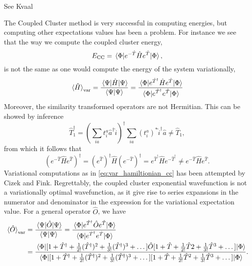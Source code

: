 See Kvaal\cite{kvaal2013variational}

The Coupled Cluster method is very successful in computing energies, but computing other 
expectations values has been a problem. For instance we see that the way we compute the
coupled cluster energy,
\begin{equation}
    E_{\text{CC}} = \mel{\Phi}{e^{-\hat{T}}\hat{H}e^{\hat{T}}}{\Phi},
\end{equation}
is not the same as one would compute the energy of the system variationally,
\begin{equation}
    \label{eq:var_hamiltionian_cc}
    \ev*{\hat{H}}_{\text{var}} = \frac{\mel{\Psi}{\hat{H}}{\Psi}}{\braket{\Psi}}
        = \frac{ \mel{\Phi}{e^{\hat{T}^\dagger} \hat{H} e^{\hat{T}}}{\Phi} }
            {\mel{\Phi}{e^{\hat{T}^\dagger} e^{\hat{T}}}{\Phi}}
\end{equation}
Moreover, the similarity transformed operators are not Hermitian. This can be 
showed by inference
\begin{equation}
    \hat{T}^\dagger_1 = \left(\sum_{ia}t^a_i\hat{a}^\dagger \hat{i} \right)^\dagger 
        \sum_{ia} (t^a_i)^* \hat{i}^\dagger\hat{a} \neq \hat{T}_1,
\end{equation}
from which it follows that 
\begin{equation}
    \left(e^{-\hat{T}}\hat{H}e^{\hat{T}} \right)^\dagger
        = (e^{\hat{T}})^\dagger\hat{H}(e^{-\hat{T}})^\dagger
        = e^{\hat{T}^\dagger}\hat{H}e^{-\hat{T}^\dagger} 
        \neq e^{-\hat{T}}\hat{H}e^{\hat{T}}.
\end{equation}
Variational computations as in \autoref{eq:var_hamiltionian_cc} has been attempted 
by Cizek\cite{vcivzek1966correlation} and Fink\cite{fink1974new}.
Regrettably, the coupled cluster exponential 
wavefunction is not a variationally optimal wavefunction, as it give rise to
series expansions in the 
numerator and denominator in the expression for the variational expectation value. 
For a general operator $\hat{O}$, we have
\begin{equation}
    \begin{aligned}
        \label{eq:variational_exp_val_cc}
        \ev*{\hat{O}}_{\text{var}} &=\frac{ \mel{\Psi}{\hat{O}}{\Psi} }{\braket{\Psi}} 
            = \frac{ \mel{\Phi}{e^{\hat{T}^\dagger} \hat{O} e^{\hat{T}}}{\Phi} }
                {\mel{\Phi}{e^{\hat{T}^\dagger} e^{\hat{T}}}{\Phi}} \\
            &= \frac{
                \mel{\Phi}{
                [1 + \hat{T}^\dagger + \frac{1}{2!}(\hat{T}^\dagger)^2 + \frac{1}{3!}(\hat{T}^\dagger)^3 + \dots]
                \hat{O} 
                [1 + \hat{T}+ \frac{1}{2!}\hat{T}2 + \frac{1}{3!}\hat{T}^3 + \dots]
                }{\Phi}
                }{
                \mel
                {\Phi}
                {
                [1 + \hat{T}^\dagger + \frac{1}{2!}(\hat{T}^\dagger)^2 + \frac{1}{3!}(\hat{T}^\dagger)^3 + \dots]
                [1 + \hat{T} + \frac{1}{2!}\hat{T}^2 + \frac{1}{3!}\hat{T}^3 + \dots]
                } 
                {\Phi}
                }.
    \end{aligned}
\end{equation}

